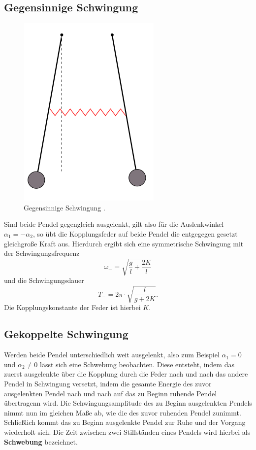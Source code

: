 \subsection{Gegensinnige Schwingung}
\FloatBarrier
\begin{figure}
	\centering
	\includegraphics[width=0.4\linewidth]{Bilder/gegenphasig.png}
	\caption{Gegensinnige Schwingung \cite{Anleitung}.}
	\label{fig:gegen}
\end{figure}
\FloatBarrier
Sind beide Pendel gegengleich ausgelenkt, gilt also für die Auslenkwinkel $\alpha_1=-\alpha_2$, so übt die Kopplungsfeder auf beide Pendel die entgegegen gesetzt gleichgroße Kraft aus.
Hierdurch ergibt sich eine symmetrische Schwingung mit der Schwingungsfrequenz
\begin{equation}
	\label{eqn:wgegen}
	\omega_{\mathrm{-}}=\sqrt{\frac{g}{l}+\frac{2 K}{l}}
\end{equation}
und die Schwingungsdauer
\begin{equation}
	\label{eqn:tgegen}
	T_{\mathrm{-}}=2\pi\cdot\sqrt{\frac{l}{g+2K}} \text{.}
\end{equation}
Die Kopplungskonstante der Feder ist hierbei $K$.
\subsection{Gekoppelte Schwingung}
Werden beide Pendel unterschiedlich weit ausgelenkt, also zum Beispiel $\alpha_1=0$ und $\alpha_2 \neq 0$ lässt sich eine Schwebung beobachten.
Diese entsteht, indem das zuerst ausgelenkte über die Kopplung durch die Feder nach und nach das andere Pendel in Schwingung versetzt, indem die gesamte Energie des zuvor ausgelenkten Pendel nach und nach auf das zu Beginn ruhende Pendel übertragenn wird.
Die Schwingungsamplitude des zu Beginn ausgelenkten Pendels nimmt nun im gleichen Maße ab, wie die des zuvor ruhenden Pendel zunimmt.
Schließlich kommt das zu Beginn ausgelenkte Pendel zur Ruhe und der Vorgang wiederholt sich.
Die Zeit zwischen zwei Stillständen eines Pendels wird hierbei als \textbf{Schwebung} bezeichnet.
\FloatBarrier

